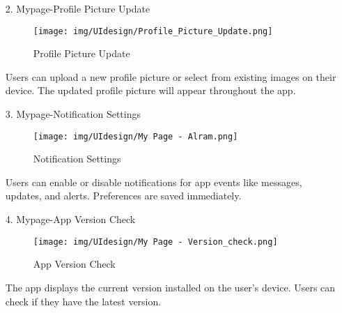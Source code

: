 \documentclass[conference]{IEEEtran}
\begin{document}
\begin{enumerate}
\begin{itemize}
\begin{itemize}
\begin{enumerate}
\begin{enumerate}
    \item[2.] Mypage-Profile Picture Update
    \begin{figure}[h]
        {\centering
        \hspace{4cm}
        \begin{minipage}{0.4\columnwidth}
            \texttt{[image: img/UIdesign/Profile\_Picture\_Update.png]}
            \caption{Profile Picture Update}
        \end{minipage}}
    \end{figure}

    Users can upload a new profile picture or select from existing images on their device. The updated profile picture will appear throughout the app. \\
\end{enumerate}

\begin{enumerate}
    \item[3.] Mypage-Notification Settings
    \begin{figure}[h]
        {\centering
        \hspace{4cm}
        \begin{minipage}{0.4\columnwidth}
            \texttt{[image: img/UIdesign/My Page - Alram.png]}
            \caption{Notification Settings}
        \end{minipage}}
    \end{figure}

    Users can enable or disable notifications for app events like messages, updates, and alerts. Preferences are saved immediately. \\ 
\end{enumerate}

\begin{enumerate}
    \item[4.] Mypage-App Version Check
    \begin{figure}[h]
        {\centering
        \hspace{4cm}
        \begin{minipage}{0.4\columnwidth}
            \texttt{[image: img/UIdesign/My Page - Version\_check.png]}
            \caption{App Version Check}
        \end{minipage}}
    \end{figure}

    The app displays the current version installed on the user's device. Users can check if they have the latest version. \\
\end{enumerate}


\end{enumerate}
\end{itemize}
\end{itemize}
\end{enumerate}
\end{document}
